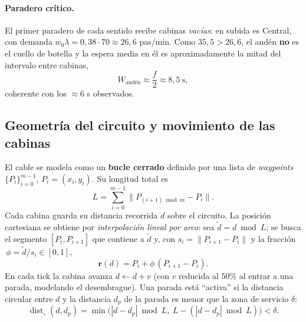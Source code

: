 \documentclass[11pt,a4paper]{article}
\begin{document}
\paragraph{Paradero crítico.} El primer paradero de cada sentido recibe cabinas
\emph{vacías}: en subida es Central, con demanda
$w_0\lambda = 0{,}38\cdot 70 \approx 26{,}6$ pas/min. Como
$35{,}5 > 26{,}6$, el andén \textbf{no} es el cuello de botella y la espera media en
él es aproximadamente la mitad del intervalo entre cabinas,
\begin{equation}
W_{\text{andén}} \approx \frac{f}{2} \approx 8{,}5\ \text{s},
\end{equation}
coherente con los $\approx 6$ s observados.

\subsection{Geometría del circuito y movimiento de las cabinas}
El cable se modela como un \textbf{bucle cerrado} definido por una lista de
\emph{waypoints} $\{P_i\}_{i=0}^{m-1}$, $P_i=(x_i,y_i)$. Su longitud total es
\begin{equation}
L = \sum_{i=0}^{m-1} \lVert P_{(i+1)\bmod m} - P_i \rVert .
\end{equation}
Cada cabina guarda su distancia recorrida $d$ sobre el circuito. La posición
cartesiana se obtiene por \emph{interpolación lineal por arco}: sea
$\tilde d = d \bmod L$; se busca el segmento $[P_i,P_{i+1}]$ que contiene a
$\tilde d$ y, con $s_i = \lVert P_{i+1}-P_i\rVert$ y la fracción
$\,\phi = \tilde d / s_i\in[0,1]$,
\begin{equation}
\mathbf{r}(d) = P_i + \phi\,(P_{i+1}-P_i).
\end{equation}
En cada tick la cabina avanza $d \leftarrow d + v$ (con $v$ reducida al $50\%$ al
entrar a una parada, modelando el desembrague). Una parada está ``activa'' si la
distancia circular entre $d$ y la distancia $d_p$ de la parada es menor que la zona
de servicio $\delta$:
\begin{equation}
\operatorname{dist}_\circ(d,d_p) =
\min\bigl(|d-d_p| \bmod L,\ L - (|d-d_p|\bmod L)\bigr) < \delta .
\end{equation}
\end{document}
